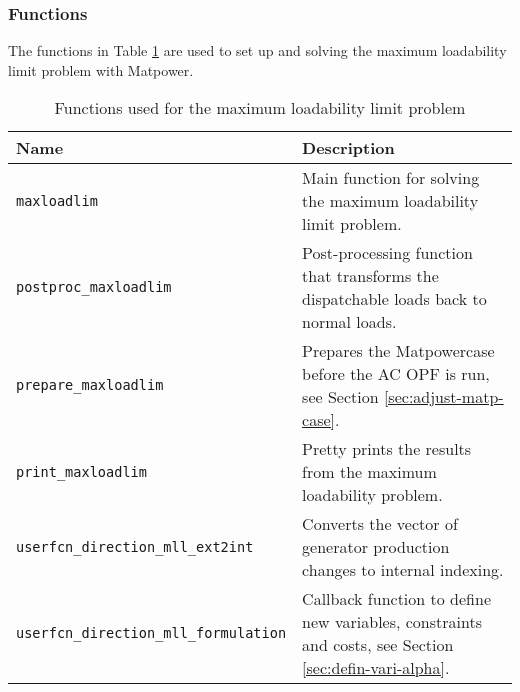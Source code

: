 \documentclass[12pt,a4]{article}
\newcommand*{\codemat}[1]{\texttt{#1}}
\newcommand*{\matpower}{{\sc Matpower}}
\begin{document}
\subsubsection{Functions}
\label{sec:functions}

The functions in Table \ref{tab:functions} are used to set up and solving the maximum loadability limit problem with \matpower{}.

\begin{table}[!h]
  \centering
  \begin{tabular}{lp{8cm}}
  \toprule
  Name  & Description \\
  \midrule
  \codemat{maxloadlim} & Main function for solving the maximum loadability limit problem.\\
  \codemat{postproc\_maxloadlim} & Post-processing function that transforms the dispatchable loads back to normal loads.\\
  \codemat{prepare\_maxloadlim} & Prepares the \matpower case before the AC OPF is run, see Section \ref{sec:adjust-matp-case}.\\
  \codemat{print\_maxloadlim} & Pretty prints the results from the maximum loadability problem.\\
  \codemat{userfcn\_direction\_mll\_ext2int} & Converts the vector of generator production changes to internal indexing.\\
  \codemat{userfcn\_direction\_mll\_formulation} & Callback function to define new variables, constraints and costs, see Section \ref{sec:defin-vari-alpha}. \\
  \bottomrule
  \end{tabular}
  \caption{Functions used for the maximum loadability limit problem}
  \label{tab:functions}
\end{table}
\end{document}
